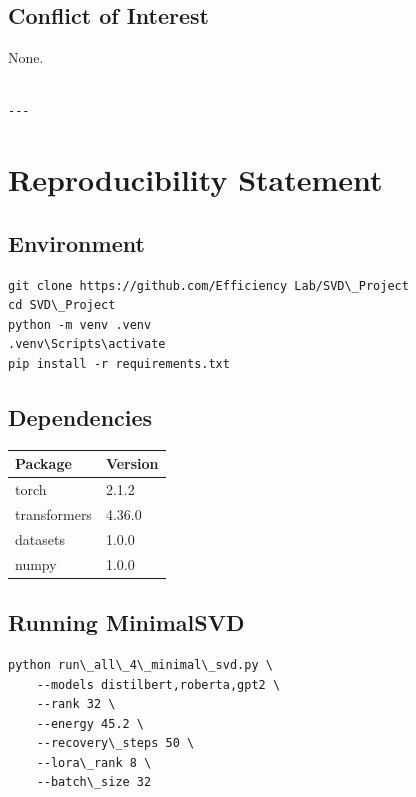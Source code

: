 \subsection{Conflict of Interest}

None.
\begin{lstlisting}

---
\end{lstlisting}


\section{Reproducibility Statement}

\subsection{Environment}

\begin{lstlisting}
git clone https://github.com/Efficiency Lab/SVD\_Project
cd SVD\_Project
python -m venv .venv
.venv\Scripts\activate
pip install -r requirements.txt
\end{lstlisting}

\subsection{Dependencies}

\begin{table}[H]
\centering
\small
\begin{tabular}{ll}
\toprule
\textbf{Package} & \textbf{Version} \\
\midrule
torch & 2.1.2 \\
transformers & 4.36.0 \\
datasets & 1.0.0 \\
numpy & 1.0.0 \\
\bottomrule
\end{tabular}
\end{table}

\subsection{Running MinimalSVD}

\begin{lstlisting}
python run\_all\_4\_minimal\_svd.py \
    --models distilbert,roberta,gpt2 \
    --rank 32 \
    --energy 45.2 \
    --recovery\_steps 50 \
    --lora\_rank 8 \
    --batch\_size 32
\end{lstlisting}

